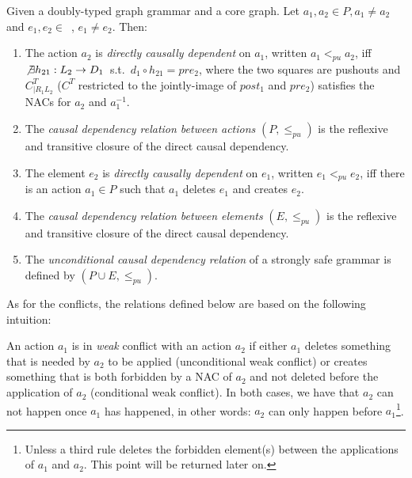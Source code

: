 \begin{definition} Given \doublyTypedGraphGrammarCore{} a doubly-typed graph grammar and \coreGraph{} a core graph. Let $a_1, a_2 \in P, a_1 \ne a_2$ and \mbox{$e_1, e_2 \in $ \coreGraph{},} $e_1 \ne e_2$. Then: 

  \begin{enumerate}
    \item The action $a_2$ is \emph{directly causally dependent} on $a_1$, written $a_1 <_{pu} a_2$, iff \mbox{$\not\exists h_{21} : L_2 \rightarrow D_1$ s.t. \mbox{$d_1 \circ h_{21} = pre_2$}}, where the two squares are pushouts and $C^T_{|R_1L_2}$ ($C^T$ restricted to the jointly-image of $post_1$ and $pre_2$) satisfies the NACs for $a_2$ and $a_1^{-1}$.


   \item The \emph{causal dependency relation between actions} $(P, \leq_{pu})$ is the reflexive and transitive closure of the direct causal dependency.
   \item The element $e_2$ is \emph{directly causally dependent} on $e_1$, written $e_1 <_{pu} e_2$, iff there is an action $a_1 \in P$ such that $a_1$ deletes $e_1$ and creates $e_2$.
   \item The \emph{causal dependency relation between elements} $(E, \leq_{pu})$ is the reflexive and transitive closure of the direct causal dependency.
   \item The \emph{unconditional causal dependency relation} of a strongly safe grammar is defined by $(P \cup E, \leq_{pu})$.
  \end{enumerate}
\end{definition}


As for the conflicts, the relations defined below are based on the following intuition: 

\begin{intuition} An action $a_1$ is in \emph{weak} conflict with an action $a_2$ if either $a_1$ deletes something that is needed by $a_2$ to be applied (unconditional weak conflict) or creates something that is both forbidden by a NAC of $a_2$ and not deleted before the application of $a_2$ (conditional weak conflict). In both cases, we have that $a_2$ can not happen once $a_1$ has happened, in other words: $a_2$ can only happen before $a_1$\footnote{Unless a third rule deletes the forbidden
  element(s) between the applications of $a_1$ and $a_2$. This point will be returned later on.}.
\end{intuition}


